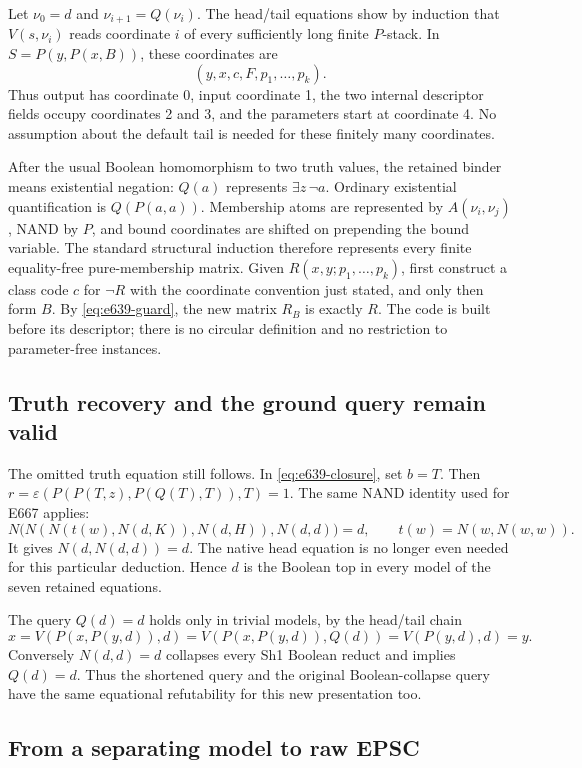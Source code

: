 Let \(\nu_0=d\) and \(\nu_{i+1}=Q(\nu_i)\).  The head/tail equations
show by induction that \(V(s,\nu_i)\) reads coordinate \(i\) of every
sufficiently long finite \(P\)-stack.  In
\(S=P(y,P(x,B))\), these coordinates are
\[
               (y,x,c,F,p_1,\ldots,p_k).
\]
Thus output has coordinate 0, input coordinate 1, the two internal
descriptor fields occupy coordinates 2 and 3, and the parameters start
at coordinate 4.  No assumption about the default tail is needed for
these finitely many coordinates.

After the usual Boolean homomorphism to two truth values, the retained
binder means existential negation: \(Q(a)\) represents
\(\exists z\,\neg a\).  Ordinary existential quantification is
\(Q(P(a,a))\).  Membership atoms are represented by
\(A(\nu_i,\nu_j)\), NAND by \(P\), and bound coordinates are shifted
on prepending the bound variable.  The standard structural induction
therefore represents every finite equality-free pure-membership matrix.
Given \(R(x,y;p_1,\ldots,p_k)\), first construct a class code \(c\) for
\(\neg R\) with the coordinate convention just stated, and only then
form \(B\).  By \eqref{eq:e639-guard}, the new matrix \(R_B\) is exactly
\(R\).  The code is built before its descriptor; there is no circular
definition and no restriction to parameter-free instances.

\subsection{Truth recovery and the ground query remain valid}

The omitted truth equation still follows.  In
\eqref{eq:e639-closure}, set \(b=T\).  Then
\(r=\varepsilon(P(P(T,z),P(Q(T),T)),T)=1\).
The same NAND identity used for E667 applies:
\[
 N\bigl(N(N(t(w),N(d,K)),N(d,H)),N(d,d)\bigr)=d,
 \qquad t(w)=N(w,N(w,w)).
\]
It gives \(N(d,N(d,d))=d\).  The native head equation is no longer even
needed for this particular deduction.  Hence \(d\) is the Boolean top
in every model of the seven retained equations.

The query \(Q(d)=d\) holds only in trivial models, by the head/tail chain
\[
 x=V(P(x,P(y,d)),d)=V(P(x,P(y,d)),Q(d))=V(P(y,d),d)=y.
\]
Conversely \(N(d,d)=d\) collapses every Sh1 Boolean reduct and implies
\(Q(d)=d\).  Thus the shortened query and the original Boolean-collapse
query have the same equational refutability for this new presentation too.

\subsection{From a separating model to raw EPSC}

